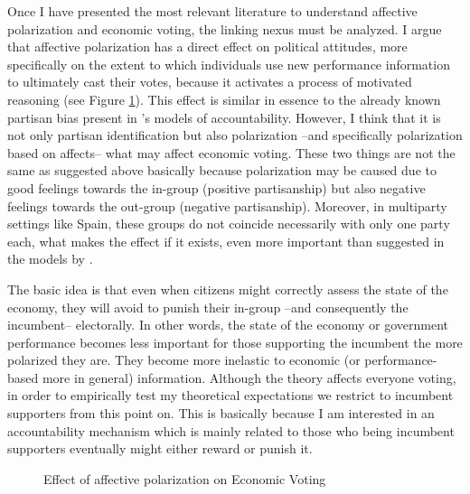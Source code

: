 \documentclass[a4paper, svgnames]{article}
\begin{document}
Once I have presented the most relevant literature to understand affective polarization and economic voting, the linking nexus must be analyzed. I argue that affective polarization has a direct effect on political attitudes, more specifically on the extent to which individuals use new performance information to ultimately cast their votes, because it activates a process of motivated reasoning (see Figure \ref{fig:model}). This effect is similar in essence to the already known partisan bias present in  \citet*{tilleyGovernmentBlameExperimental2011a}'s models of accountability. However, I think that it is not only partisan identification but also polarization --and specifically polarization based on affects-- what may affect economic voting. These two things are not the same as suggested above basically because polarization may be caused due to good feelings towards the in-group (positive partisanship) but also negative feelings towards the out-group (negative partisanship). Moreover, in multiparty settings like Spain, these groups do not coincide necessarily with only one party each, what makes the effect if it exists, even more important than suggested in the models by \citet*{tilleyGovernmentBlameExperimental2011a}.

The basic idea is that even when citizens might correctly assess the state of the economy, they will avoid to punish their in-group --and consequently the incumbent-- electorally. In other words, the state of the economy or government performance becomes less important for those supporting the incumbent the more polarized they are. They become more inelastic to economic (or performance-based more in general) information. Although the theory affects everyone voting, in order to empirically test my theoretical expectations we restrict to incumbent supporters from this point on. This is basically because I am interested in an accountability mechanism which is mainly related to those who being incumbent supporters eventually might either reward or punish it.

\begin{figure}[H]
	\centering
	\caption{\label{fig:model} Effect of affective polarization on Economic Voting}
\end{figure}
\end{document}
